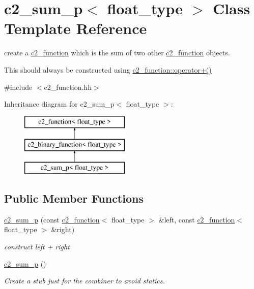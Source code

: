 \hypertarget{classc2__sum__p}{\section{c2\-\_\-sum\-\_\-p$<$ float\-\_\-type $>$ Class Template Reference}
\label{classc2__sum__p}
}


create a \hyperlink{classc2__function}{c2\-\_\-function} which is the sum of two other \hyperlink{classc2__function}{c2\-\_\-function} objects.

This should always be constructed using \hyperlink{classc2__function_a268b206b47c55e635e5f0a9e0f3e8ded}{c2\-\_\-function\-::operator+()}  




{\ttfamily \#include $<$c2\-\_\-function.\-hh$>$}

Inheritance diagram for c2\-\_\-sum\-\_\-p$<$ float\-\_\-type $>$\-:\begin{figure}[H]
\begin{center}
\leavevmode
\includegraphics[height=3.000000cm]{classc2__sum__p}
\end{center}
\end{figure}
\subsection*{Public Member Functions}
\begin{DoxyCompactItemize}
\item 
\hyperlink{classc2__sum__p_ae42d9b2095cb521b23e19f1467d5e61d}{c2\-\_\-sum\-\_\-p} (const \hyperlink{classc2__function}{c2\-\_\-function}$<$ float\-\_\-type $>$ \&left, const \hyperlink{classc2__function}{c2\-\_\-function}$<$ float\-\_\-type $>$ \&right)
\begin{DoxyCompactList}\small\item\em construct {\itshape left} + {\itshape right} \end{DoxyCompactList}\item 
\hypertarget{classc2__sum__p_a434a01eaefb0481af72f9ef39b9b812f}{\hyperlink{classc2__sum__p_a434a01eaefb0481af72f9ef39b9b812f}{c2\-\_\-sum\-\_\-p} ()}\label{classc2__sum__p_a434a01eaefb0481af72f9ef39b9b812f}

\begin{DoxyCompactList}\small\item\em Create a stub just for the combiner to avoid statics. \end{DoxyCompactList}\end{DoxyCompactItemize}
